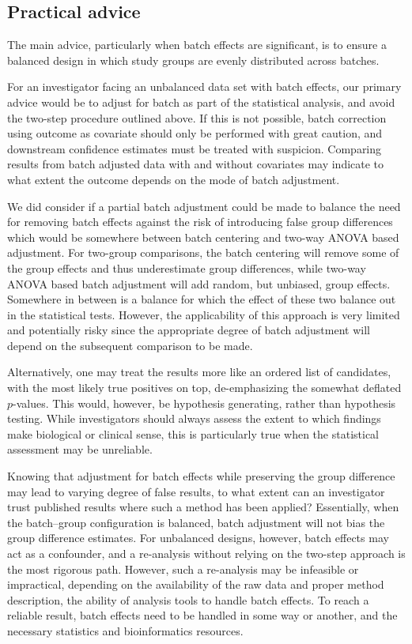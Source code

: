 \documentclass{bio}
\begin{document}
\subsection{Practical advice}

The main advice, particularly when batch effects are significant, is to ensure a balanced design in which study groups are evenly distributed across batches.

For an investigator facing an unbalanced data set with batch effects, our primary advice would be to adjust for batch as part of the statistical analysis, and avoid the two-step procedure outlined above. If this is not possible, batch correction using outcome as covariate should only be performed with great caution, and downstream confidence estimates must be treated with suspicion. Comparing results from batch adjusted data with and without covariates may indicate to what extent the outcome depends on the mode of batch adjustment.

We did consider if a partial batch adjustment could be made to balance the need for removing batch effects against the risk of introducing false group differences which would be somewhere between batch centering and two-way ANOVA based adjustment. For two-group comparisons, the batch centering will remove some of the group effects and thus underestimate group differences, while two-way ANOVA based batch adjustment will add random, but unbiased, group effects. Somewhere in between is a balance for which the effect of these two balance out in the statistical tests. However, the applicability of this approach is very limited and potentially risky since the appropriate degree of batch adjustment will depend on the subsequent comparison to be made.

Alternatively, one may treat the results more like an ordered list of candidates, with the most likely true positives on top, de-emphasizing the somewhat deflated $p$-values. This would, however, be hypothesis generating, rather than hypothesis testing. While investigators should always assess the extent to which findings make biological or clinical sense, this is particularly true when the statistical assessment may be unreliable.

Knowing that adjustment for batch effects while preserving the group difference may lead to varying degree of false results, to what extent can an investigator trust published results where such a method has been applied? Essentially, when the batch--group configuration is balanced, batch adjustment will not bias the group difference estimates. For unbalanced designs, however, batch effects may act as a confounder, and a re-analysis without relying on the two-step approach is the most rigorous path. However, such a re-analysis may be infeasible or impractical, depending on the availability of the raw data and proper method description, the ability of analysis tools to handle batch effects. To reach a reliable result, batch effects need to be handled in some way or another, and the necessary statistics and bioinformatics resources.
\end{document}
